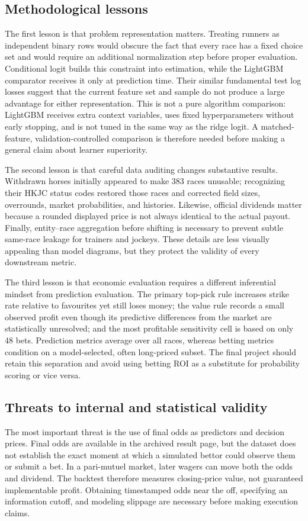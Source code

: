 \subsection{Methodological lessons}\label{sec:discussion-lessons}
The first lesson is that problem representation matters. Treating runners as independent binary rows would obscure the fact that every race has a fixed choice set and would require an additional normalization step before proper evaluation. Conditional logit builds this constraint into estimation, while the LightGBM comparator receives it only at prediction time. Their similar fundamental test log losses suggest that the current feature set and sample do not produce a large advantage for either representation. This is not a pure algorithm comparison: LightGBM receives extra context variables, uses fixed hyperparameters without early stopping, and is not tuned in the same way as the ridge logit. A matched-feature, validation-controlled comparison is therefore needed before making a general claim about learner superiority.

The second lesson is that careful data auditing changes substantive results. Withdrawn horses initially appeared to make 383 races unusable; recognizing their HKJC status codes restored those races and corrected field sizes, overrounds, market probabilities, and histories. Likewise, official dividends matter because a rounded displayed price is not always identical to the actual payout. Finally, entity--race aggregation before shifting is necessary to prevent subtle same-race leakage for trainers and jockeys. These details are less visually appealing than model diagrams, but they protect the validity of every downstream metric.

The third lesson is that economic evaluation requires a different inferential mindset from prediction evaluation. The primary top-pick rule increases strike rate relative to favourites yet still loses money; the value rule records a small observed profit even though its predictive differences from the market are statistically unresolved; and the most profitable sensitivity cell is based on only 48 bets. Prediction metrics average over all races, whereas betting metrics condition on a model-selected, often long-priced subset. The final project should retain this separation and avoid using betting ROI as a substitute for probability scoring or vice versa.

\subsection{Threats to internal and statistical validity}\label{sec:discussion-limitations}
The most important threat is the use of final odds as predictors and decision prices. Final odds are available in the archived result page, but the dataset does not establish the exact moment at which a simulated bettor could observe them or submit a bet. In a pari-mutuel market, later wagers can move both the odds and dividend. The backtest therefore measures closing-price value, not guaranteed implementable profit. Obtaining timestamped odds near the off, specifying an information cutoff, and modeling slippage are necessary before making execution claims.

